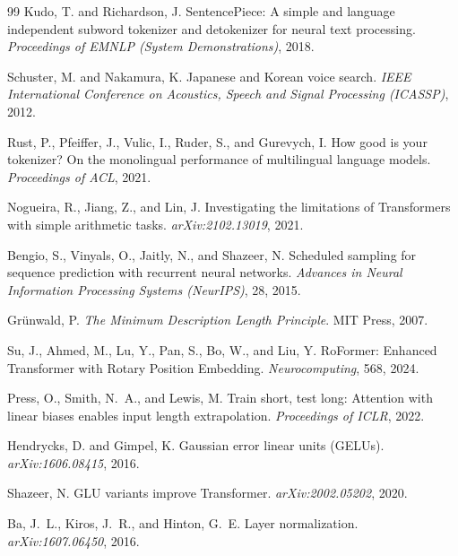 \documentclass[11pt,a4paper]{article}
\theoremstyle{definition}
\theoremstyle{plain}
\begin{document}
\begin{thebibliography}{99}
  Kudo, T. and Richardson, J.
  \newblock SentencePiece: A simple and language independent subword tokenizer
  and detokenizer for neural text processing.
  \newblock \textit{Proceedings of EMNLP (System Demonstrations)}, 2018.

  Schuster, M. and Nakamura, K.
  \newblock Japanese and Korean voice search.
  \newblock \textit{IEEE International Conference on Acoustics, Speech and
  Signal Processing (ICASSP)}, 2012.

  Rust, P., Pfeiffer, J., Vulic, I., Ruder, S., and Gurevych, I.
  \newblock How good is your tokenizer? On the monolingual performance of
  multilingual language models.
  \newblock \textit{Proceedings of ACL}, 2021.

  Nogueira, R., Jiang, Z., and Lin, J.
  \newblock Investigating the limitations of Transformers with simple arithmetic tasks.
  \newblock \textit{arXiv:2102.13019}, 2021.

  Bengio, S., Vinyals, O., Jaitly, N., and Shazeer, N.
  \newblock Scheduled sampling for sequence prediction with recurrent neural networks.
  \newblock \textit{Advances in Neural Information Processing Systems (NeurIPS)}, 28, 2015.

  Gr\"{u}nwald, P.
  \newblock \textit{The Minimum Description Length Principle}.
  \newblock MIT Press, 2007.

  Su, J., Ahmed, M., Lu, Y., Pan, S., Bo, W., and Liu, Y.
  \newblock RoFormer: Enhanced Transformer with Rotary Position Embedding.
  \newblock \textit{Neurocomputing}, 568, 2024.

  Press, O., Smith, N.\ A., and Lewis, M.
  \newblock Train short, test long: Attention with linear biases enables
  input length extrapolation.
  \newblock \textit{Proceedings of ICLR}, 2022.

  Hendrycks, D. and Gimpel, K.
  \newblock Gaussian error linear units (GELUs).
  \newblock \textit{arXiv:1606.08415}, 2016.

  Shazeer, N.
  \newblock GLU variants improve Transformer.
  \newblock \textit{arXiv:2002.05202}, 2020.

  Ba, J.\ L., Kiros, J.\ R., and Hinton, G.\ E.
  \newblock Layer normalization.
  \newblock \textit{arXiv:1607.06450}, 2016.


\end{thebibliography}
\end{document}

